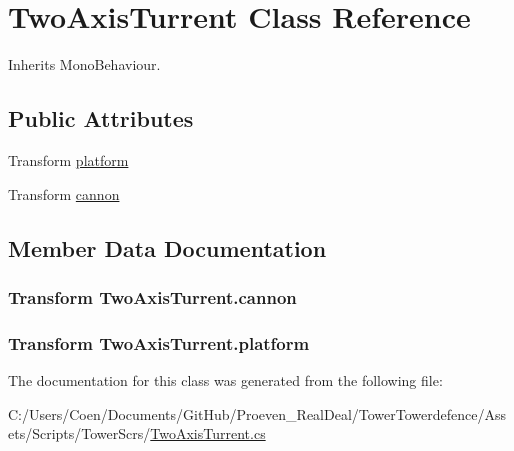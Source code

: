 \hypertarget{class_two_axis_turrent}{}\section{Two\+Axis\+Turrent Class Reference}
\label{class_two_axis_turrent}


Inherits Mono\+Behaviour.

\subsection*{Public Attributes}
\begin{DoxyCompactItemize}
\item 
Transform \hyperlink{class_two_axis_turrent_a411880f2a15363360e85ef8d556ce4f3}{platform}
\item 
Transform \hyperlink{class_two_axis_turrent_a0eaaf9133ee2183c3490661d9f8b6550}{cannon}
\end{DoxyCompactItemize}


\subsection{Member Data Documentation}
\subsubsection[{\texorpdfstring{cannon}{cannon}}]{\setlength{\rightskip}{0pt plus 5cm}Transform Two\+Axis\+Turrent.\+cannon}\hypertarget{class_two_axis_turrent_a0eaaf9133ee2183c3490661d9f8b6550}{}\label{class_two_axis_turrent_a0eaaf9133ee2183c3490661d9f8b6550}
\subsubsection[{\texorpdfstring{platform}{platform}}]{\setlength{\rightskip}{0pt plus 5cm}Transform Two\+Axis\+Turrent.\+platform}\hypertarget{class_two_axis_turrent_a411880f2a15363360e85ef8d556ce4f3}{}\label{class_two_axis_turrent_a411880f2a15363360e85ef8d556ce4f3}


The documentation for this class was generated from the following file\+:\begin{DoxyCompactItemize}
\item 
C\+:/\+Users/\+Coen/\+Documents/\+Git\+Hub/\+Proeven\+\_\+\+Real\+Deal/\+Tower\+Towerdefence/\+Assets/\+Scripts/\+Tower\+Scr\textquotesingle{}s/\hyperlink{_two_axis_turrent_8cs}{Two\+Axis\+Turrent.\+cs}\end{DoxyCompactItemize}
